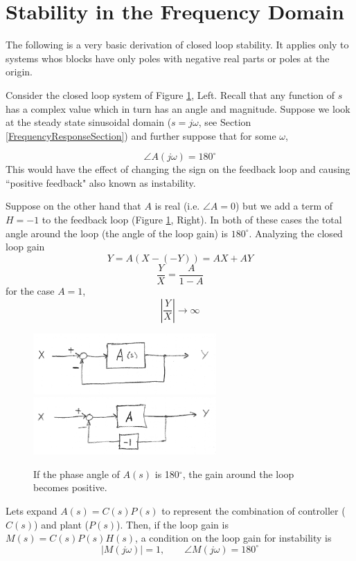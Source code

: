 \section{Stability in the Frequency Domain}



The following is a very basic derivation of closed loop stability.  It applies only to systems whos blocks have only poles with negative real parts or poles at the origin.

Consider the closed loop system of Figure \ref{NyquistLoop}, Left.  Recall that any function of $s$ has a complex value which in turn has an angle and magnitude.  Suppose we look at the steady state sinusoidal domain ($s=j\omega$, see Section \ref{FrequencyResponseSection}) and further suppose that for some $\omega$,

$$
\angle A(j\omega) = 180^\circ
$$
This would have the effect of changing the sign on the feedback loop and causing ``positive
 feedback" also known as instability.


Suppose on the other hand that $A$ is real (i.e. $\angle A = 0$) but we add a term of $H=-1$ to the feedback loop (Figure \ref{NyquistLoop}, Right).  In both of these cases the total angle around the loop (the angle of the loop gain) is $180^\circ$.    Analyzing the closed loop gain
\[
Y = A(X-(-Y)) = AX + AY
\]
\[
\frac{Y}{X}  = \frac {A} {1-A}
\]
for the case $A=1$,
\[
|\frac{Y}{X}| \to \infty
\]


\begin{figure}\centering
\includegraphics[width=2.75in]{figs06/00792a.png}
\includegraphics[width=2.75in]{figs06/00793a.png}
\caption{If the phase angle of $A(s)$ is 180$^\circ$, the gain around the loop becomes positive.}\label{NyquistLoop}
\end{figure}

Lets expand $A(s) = C(s)P(s)$ to represent the combination of controller ($C(s)$) and
plant ($P(s)$). Then, if the loop gain is $M(s) = C(s)P(s)H(s)$, a condition on the loop gain for instability is
\[
\left | M(j\omega) \right | = 1, \qquad \angle M(j\omega) = 180^\circ
\]

